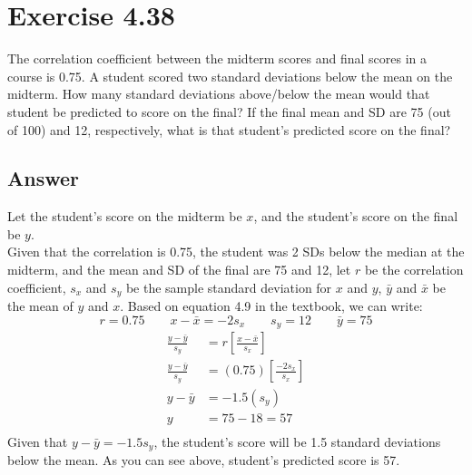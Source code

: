 \documentclass{article}
\begin{document}
	\section*{Exercise 4.38}
	
	The correlation coefficient between the midterm scores and final scores in a course is 0.75. A student scored two standard deviations below the mean on the midterm. How many standard deviations above/below the mean would that student be predicted to score on the final? If the final mean and SD are 75 (out of 100) and 12, respectively, what is that student's predicted score on the final?

	\subsection*{Answer}
	Let the student's score on the midterm be $x$, and the student's score on the final be $y$.\\
	Given that the correlation is 0.75, the student was 2 SDs below the median at the midterm, and the mean and SD of the final are 75 and 12, let $r$ be the correlation coefficient, $s_x$ and $s_y$ be the sample standard deviation for $x$ and $y$, $\bar{y}$ and $\bar{x}$ be the mean of $y$ and $x$. Based on equation 4.9 in the textbook, we can write:
	\[ r = 0.75 \qquad x-\bar{x} = -2s_x \qquad s_y = 12 \qquad \bar{y} = 75 \]
	\begin{align*}
		\frac{y-\bar{y}}{s_y} &= r\left [ \frac{x - \bar{x}}{s_x} \right ] \\
		\frac{y-\bar{y}}{s_y} &= (0.75) \left [ \frac{-2s_x}{s_x} \right ] \\
		y-\bar{y} &= -1.5(s_y) \\
		y &= 75 - 18 = 57\\
	\end{align*}
	Given that $y-\bar{y} = -1.5s_y$, the student's score will be 1.5 standard deviations below the mean. As you can see above, student's predicted score is 57.
\end{document}
